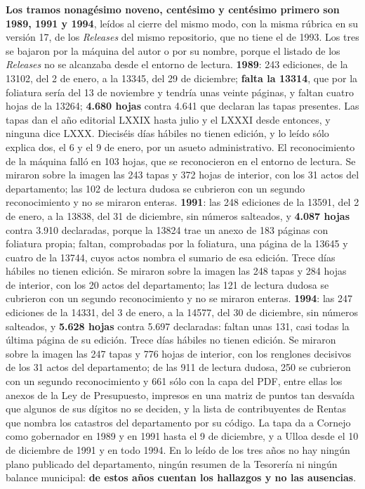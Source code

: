 \textbf{Los tramos nonagésimo noveno, centésimo y centésimo primero son 1989, 1991 y 1994}, leídos al cierre del mismo modo, con la misma rúbrica en su versión 17, de los \textit{Releases} del mismo repositorio, que no tiene el de 1993. Los tres se bajaron por la máquina del autor o por su nombre, porque el listado de los \textit{Releases} no se alcanzaba desde el entorno de lectura. \textbf{1989}: 243 ediciones, de la 13102, del 2 de enero, a la 13345, del 29 de diciembre; \textbf{falta la 13314}, que por la foliatura sería del 13 de noviembre y tendría unas veinte páginas, y faltan cuatro hojas de la 13264; \textbf{4.680 hojas} contra 4.641 que declaran las tapas presentes. Las tapas dan el año editorial LXXIX hasta julio y el LXXXI desde entonces, y ninguna dice LXXX. Dieciséis días hábiles no tienen edición, y lo leído sólo explica dos, el 6 y el 9 de enero, por un asueto administrativo. El reconocimiento de la máquina falló en 103 hojas, que se reconocieron en el entorno de lectura. Se miraron sobre la imagen las 243 tapas y 372 hojas de interior, con los 31 actos del departamento; las 102 de lectura dudosa se cubrieron con un segundo reconocimiento y no se miraron enteras. \textbf{1991}: las 248 ediciones de la 13591, del 2 de enero, a la 13838, del 31 de diciembre, sin números salteados, y \textbf{4.087 hojas} contra 3.910 declaradas, porque la 13824 trae un anexo de 183 páginas con foliatura propia; faltan, comprobadas por la foliatura, una página de la 13645 y cuatro de la 13744, cuyos actos nombra el sumario de esa edición. Trece días hábiles no tienen edición. Se miraron sobre la imagen las 248 tapas y 284 hojas de interior, con los 20 actos del departamento; las 121 de lectura dudosa se cubrieron con un segundo reconocimiento y no se miraron enteras. \textbf{1994}: las 247 ediciones de la 14331, del 3 de enero, a la 14577, del 30 de diciembre, sin números salteados, y \textbf{5.628 hojas} contra 5.697 declaradas: faltan unas 131, casi todas la última página de su edición. Trece días hábiles no tienen edición. Se miraron sobre la imagen las 247 tapas y 776 hojas de interior, con los renglones decisivos de los 31 actos del departamento; de las 911 de lectura dudosa, 250 se cubrieron con un segundo reconocimiento y 661 sólo con la capa del PDF, entre ellas los anexos de la Ley de Presupuesto, impresos en una matriz de puntos tan desvaída que algunos de sus dígitos no se deciden, y la lista de contribuyentes de Rentas que nombra los catastros del departamento por su código. La tapa da a Cornejo como gobernador en 1989 y en 1991 hasta el 9 de diciembre, y a Ulloa desde el 10 de diciembre de 1991 y en todo 1994. En lo leído de los tres años no hay ningún plano publicado del departamento, ningún resumen de la Tesorería ni ningún balance municipal: \textbf{de estos años cuentan los hallazgos y no las ausencias}.

